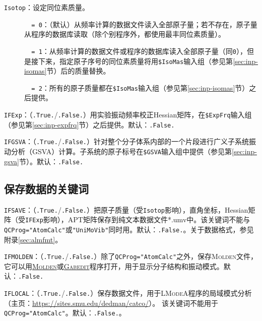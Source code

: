 \documentclass[12pt,a4paper,openany,twoside,cap,UTF8]{ctexbook}
\begin{document}
\bigskip{}
\verb|Isotop|：设定同位素质量。
\begin{description}
\item[ ]\verb|  = 0|：（默认）从频率计算的数据文件读入全部原子量；若不存在，原子量从程序的数据库读取（除个别程序外，都使用最丰同位素质量）。
\item[ ]\verb|  = 1|：从频率计算的数据文件或程序的数据库读入全部原子量（同\verb|0|），但是接下来，指定原子序号的同位素质量将用\verb|$IsoMas|输入组（参见第\ref{sec:inp-isomas}节）后的质量替换。
\item[ ]\verb|  = 2|：所有的原子质量都在\verb|$IsoMas|输入组（参见第\ref{sec:inp-isomas}节）之后提供。
\end{description}

\bigskip{}
\verb|IFExp|：（\verb|.True.|/\verb|.False.|）用实验振动频率校正Hessian矩阵，在\verb|$ExpFrq|输入组（参见第\ref{sec:inp-expfrq}节）之后提供。默认：\verb|.False.|

\bigskip{}
\verb|IFGSVA|：（\verb|.True.|/\verb|.False.|）针对整个分子体系内部的一个片段进行广义子系统振动分析（GSVA）计算。子系统的原子标号在\verb|$GSVA|输入组中提供（参见第\ref{sec:inp-gsva}节）。默认：\verb|.False.|



\subsection{保存数据的关键词} \label{subsec:inp-qcdata-save}

\bigskip{}
\verb|IFSAVE|：（\verb|.True.|/\verb|.False.|）把原子质量（受\verb|Isotop|影响），直角坐标，Hessian矩阵（受\verb|IFExp|影响），APT矩阵保存到纯文本数据文件*.umv中。该关键词不能与\verb|QCProg="AtomCalc"|或\verb|"UniMoVib"|同时用。默认：\verb|.False.|。关于数据格式，参见附录\ref{sec:almfmt}。

\bigskip{}
\verb|IFMOLDEN|：（\verb|.True.|/\verb|.False.|）除了\verb|QCProg="AtomCalc"|之外，保存\textsc{Molden}文件，它可以用\href{http://www.cmbi.ru.nl/molden/molden.html}{\textsc{Molden}}或\href{http://gabedit.sourceforge.net/}{\textsc{Gabedit}}程序打开，用于显示分子结构和振动模式。默认：\verb|.False.|

\bigskip{}
\verb|IFLOCAL|：（\verb|.True.|/\verb|.False.|）保存数据文件，用于\textsc{LModeA}程序的局域模式分析（主页：\href{https://sites.smu.edu/dedman/catco/}{https://sites.smu.edu/dedman/catco/}）。
该关键词不能用于\verb|QCProg="AtomCalc"|。默认：\verb|.False.|。
\end{document}
